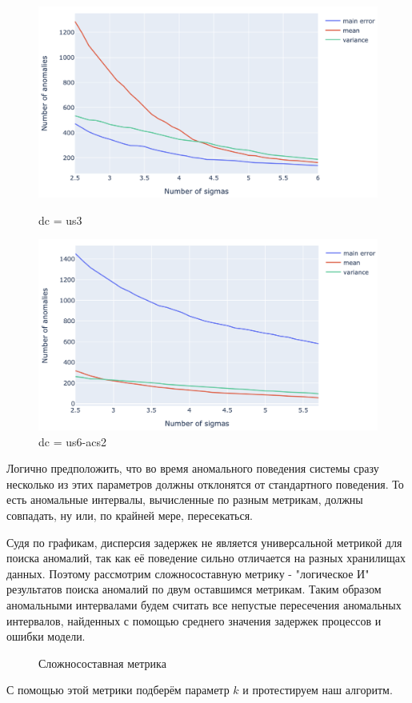 \documentclass[14pt, a4paper]{extarticle}
\begin{document}
\begin{figure}[!htb]
		\includegraphics[width=\linewidth]{figures/modes_us3.png}
		\caption{dc = us3}
		\endminipage\hfill
		\includegraphics[width=\linewidth]{figures/modes_us6_acs2.png}
		\caption{dc = us6-acs2}
		\endminipage
	\end{figure}
	
	Логично предположить, что во время аномального поведения системы сразу несколько из этих параметров должны отклонятся от стандартного поведения. То есть аномальные интервалы, вычисленные по разным метрикам, должны совпадать, ну или, по крайней мере, пересекаться. 
	
	Судя по графикам, дисперсия задержек не является  универсальной метрикой для поиска аномалий, так как её поведение сильно отличается на разных хранилищах данных. Поэтому рассмотрим сложносоставную метрику - "$\texttt{логическое И}$" \;результатов поиска аномалий по двум оставшимся метрикам. Таким образом аномальными интервалами будем считать все непустые пересечения аномальных интервалов, найденных с помощью среднего значения  задержек процессов и ошибки модели.
	\begin{figure}[H]
		\centerline{} 
		\caption{Сложносоставная метрика}
		\label{target_metric_fig1}
	\end{figure} 
	С помощью этой метрики подберём параметр $k$ и протестируем наш алгоритм. 
	
\end{document}
